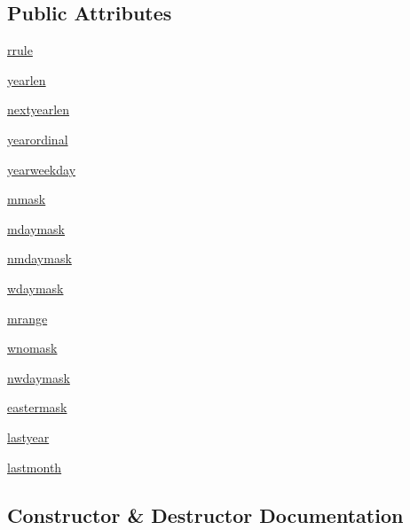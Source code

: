 \subsection*{Public Attributes}
\begin{DoxyCompactItemize}
\item 
\hyperlink{classdateutil_1_1rrule_1_1__iterinfo_a005379ff4201f629eecc7fec93a02e31}{rrule}
\item 
\hyperlink{classdateutil_1_1rrule_1_1__iterinfo_a9bb0a7a01f123e06d401f43c2f258a9e}{yearlen}
\item 
\hyperlink{classdateutil_1_1rrule_1_1__iterinfo_a91eb4df361b98ee647a8a40a50e0249a}{nextyearlen}
\item 
\hyperlink{classdateutil_1_1rrule_1_1__iterinfo_a61c7f07c828989ec5ec7a07605d19507}{yearordinal}
\item 
\hyperlink{classdateutil_1_1rrule_1_1__iterinfo_a7faed4ae91cbb46ffa8136378852e594}{yearweekday}
\item 
\hyperlink{classdateutil_1_1rrule_1_1__iterinfo_a855a642c99d52711ce38eb3518d1e367}{mmask}
\item 
\hyperlink{classdateutil_1_1rrule_1_1__iterinfo_a4323d4242e56f1749ac7466ef11f7432}{mdaymask}
\item 
\hyperlink{classdateutil_1_1rrule_1_1__iterinfo_ad05f4e0986187f9d2d6ff20c73a2135f}{nmdaymask}
\item 
\hyperlink{classdateutil_1_1rrule_1_1__iterinfo_ae26f38ecddada352ad55d08c945a4a3b}{wdaymask}
\item 
\hyperlink{classdateutil_1_1rrule_1_1__iterinfo_a1e4284ac5e87c1bb9b86d5ee2a895025}{mrange}
\item 
\hyperlink{classdateutil_1_1rrule_1_1__iterinfo_ac1d090fcd8d246a082907cddf1ba5ac5}{wnomask}
\item 
\hyperlink{classdateutil_1_1rrule_1_1__iterinfo_a8d20cc922db4059c0e66bb8e2afe5a40}{nwdaymask}
\item 
\hyperlink{classdateutil_1_1rrule_1_1__iterinfo_aaf08710a46cedb4c350520e01907e526}{eastermask}
\item 
\hyperlink{classdateutil_1_1rrule_1_1__iterinfo_a41111dd1487986894b14134429985af5}{lastyear}
\item 
\hyperlink{classdateutil_1_1rrule_1_1__iterinfo_a5b3bc2bed480b84933d241af23a5c9b2}{lastmonth}
\end{DoxyCompactItemize}


\subsection{Constructor \& Destructor Documentation}
\mbox{\label{classdateutil_1_1rrule_1_1__iterinfo_a4569daf80ca6fa655b9b69bcdc025122}} 
